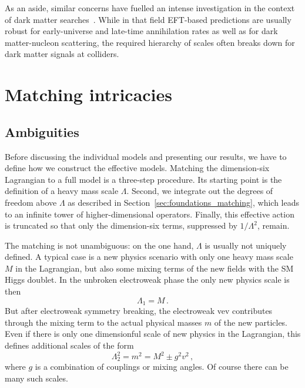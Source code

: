 As an aside, similar concerns have fuelled an intense investigation in
the context of dark matter searches~\cite{Shoemaker:2011vi,
  Busoni:2013lha, Buchmueller:2013dya, Busoni:2014sya, Racco:2015dxa,
  Bauer:2016pug}.  While in that field EFT-based predictions are
usually robust for early-universe and late-time annihilation rates as
well as for dark matter-nucleon scattering, the required hierarchy of
scales often breaks down for dark matter signals at colliders.



\section{Matching intricacies}
\label{sec:validity_matching}

\subsection{Ambiguities}

Before discussing the individual models and presenting our results, we
have to define how we construct the effective models.  Matching the
dimension-six Lagrangian to a full model is a three-step procedure.
Its starting point is the definition of a heavy mass scale $\Lambda$.
Second, we integrate out the degrees of freedom above $\Lambda$ as
described in Section~\ref{sec:foundations_matching}, which leads to an
infinite tower of higher-dimensional operators.  Finally, this
effective action is truncated so that only the dimension-six terms,
suppressed by $1 / \Lambda^2$, remain.

The matching is not unambiguous: on the one hand, $\Lambda$ is usually
not uniquely defined. A typical case is a new physics scenario with
only one heavy mass scale $M$ in the Lagrangian, but also some mixing
terms of the new fields with the SM Higgs doublet. In the unbroken
electroweak phase the only new physics scale is then
%
\begin{equation}
  \Lambda_1 = M \,.
\end{equation}
%
But after electroweak symmetry breaking, the electroweak vev
contributes through the mixing term to the actual physical masses $m$
of the new particles. Even if there is only one dimensionful scale of
new physics in the Lagrangian, this defines additional scales of the
form
%
\begin{equation}
  \Lambda_2^2 = m^2 = M^2 \pm g^2 v^2 \,,
\end{equation}
%
where $g$ is a combination of couplings or mixing angles. Of course
there can be many such scales.

